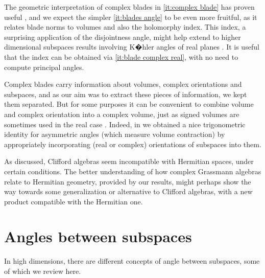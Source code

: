 \documentclass{birkjour}
\theoremstyle{definition}
\begin{document}
The geometric interpretation of complex blades in \ref{it:complex blade} has proven useful \cite{Mandolesi_Pythagorean,Mandolesi_Born,Mandolesi_Grassmann,Mandolesi_Products,Mandolesi_TotalGrassmannian,Mandolesi_Contractions},
and we expect the simpler \ref{it:blades angle} to be even more fruitful, as it relates blade norms to volumes and also the holomorphy index.
This index, a surprising application of the disjointness angle, might help extend to higher dimensional subspaces results involving K�hler angles of real planes \cite{Goldman1999,Rosenfeld1997,Tasaki2001}.
It is useful that the index can be obtained via \ref{it:blade complex real}, with no need to compute principal angles.

Complex blades carry information about volumes, complex orientations and subspaces, and as our aim was to extract these pieces of information, we kept them separated.
But for some purposes it can be convenient to combine volume and complex orientation into a complex volume, just as signed volumes are sometimes used in the real case \cite{Cameron2019}.
Indeed, in \cite[Thm.\,5.1]{Mandolesi_Identities} we obtained a nice trigonometric identity for asymmetric angles (which measure volume contraction) by appropriately incorporating (real or complex) orientations of subspaces into them.

As discussed, Clifford algebras seem incompatible with Hermitian spaces, under certain conditions.
The better understanding of how complex Grassmann algebras relate to Hermitian geometry, provided by our results, 
might perhaps show the way towards some generalization or alternative to Clifford algebras, with a new product compatible with the Hermitian one.



\appendix


\section{Angles between subspaces}\label{Angles between subspaces}


In high dimensions, there are different concepts of angle between subspaces, some of which we review here.
\end{document}
